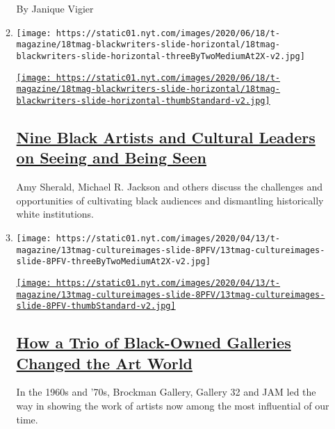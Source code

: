 \begin{enumerate}
\begin{enumerate}
    By Janique Vigier
  \item
    \texttt{[image: https://static01.nyt.com/images/2020/06/18/t-magazine/18tmag-blackwriters-slide-horizontal/18tmag-blackwriters-slide-horizontal-threeByTwoMediumAt2X-v2.jpg]}

    \href{/2020/06/23/t-magazine/black-artists-white-gaze.html}{\texttt{[image: https://static01.nyt.com/images/2020/06/18/t-magazine/18tmag-blackwriters-slide-horizontal/18tmag-blackwriters-slide-horizontal-thumbStandard-v2.jpg]}}

    \hypertarget{nine-black-artists-and-cultural-leaders-on-seeing-and-being-seen}{%
    \subsection{\texorpdfstring{\href{/2020/06/23/t-magazine/black-artists-white-gaze.html}{Nine
    Black Artists and Cultural Leaders on Seeing and Being
    Seen}}{Nine Black Artists and Cultural Leaders on Seeing and Being Seen}}\label{nine-black-artists-and-cultural-leaders-on-seeing-and-being-seen}}

    Amy Sherald, Michael R. Jackson and others discuss the challenges
    and opportunities of cultivating black audiences and dismantling
    historically white institutions.
  \item
    \texttt{[image: https://static01.nyt.com/images/2020/04/13/t-magazine/13tmag-cultureimages-slide-8PFV/13tmag-cultureimages-slide-8PFV-threeByTwoMediumAt2X-v2.jpg]}

    \href{/interactive/2020/04/13/t-magazine/black-art-galleries.html}{\texttt{[image: https://static01.nyt.com/images/2020/04/13/t-magazine/13tmag-cultureimages-slide-8PFV/13tmag-cultureimages-slide-8PFV-thumbStandard-v2.jpg]}}

    \hypertarget{how-a-trio-of-black-owned-galleries-changed-the-art-world}{%
    \subsection{\texorpdfstring{\href{/interactive/2020/04/13/t-magazine/black-art-galleries.html}{How
    a Trio of Black-Owned Galleries Changed the Art
    World}}{How a Trio of Black-Owned Galleries Changed the Art World}}\label{how-a-trio-of-black-owned-galleries-changed-the-art-world}}

    In the 1960s and '70s, Brockman Gallery, Gallery 32 and JAM led the
    way in showing the work of artists now among the most influential of
    our time.
  \end{enumerate}
\end{enumerate}

